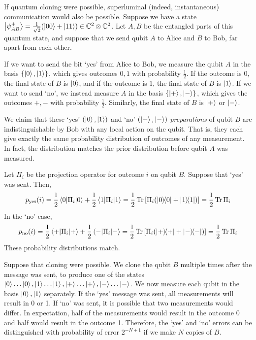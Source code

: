 If quantum cloning were possible, superluminal (indeed, instantaneous) communication would also be possible.
Suppose we have a state \( \ket{\psi^+_{AB}} = \frac{1}{\sqrt{2}} \qty(\ket{00} + \ket{11}) \in \mathbb C^2 \otimes \mathbb C^2 \).
Let \( A, B \) be the entangled parts of this quantum state, and suppose that we send qubit \( A \) to Alice and \( B \) to Bob, far apart from each other.

If we want to send the bit `yes' from Alice to Bob, we measure the qubit \( A \) in the basis \( \qty{\ket{0}, \ket{1}} \), which gives outcomes \( 0, 1 \) with probability \( \frac{1}{2} \).
If the outcome is 0, the final state of \( B \) is \( \ket{0} \), and if the outcome is 1, the final state of \( B \) is \( \ket{1} \).
If we want to send `no', we instead measure \( A \) in the basis \( \qty{\ket{+}, \ket{-}} \), which gives the outcomes \( +, - \) with probability \( \frac{1}{2} \).
Similarly, the final state of \( B \) is \( \ket{+} \) or \( \ket{-} \).

We claim that these `yes' \( (\ket{0}, \ket{1}) \) and `no' \( (\ket{+}, \ket{-}) \) \emph{preparations} of qubit \( B \) are indistinguishable by Bob with any local action on the qubit.
That is, they each give exactly the same probability distribution of outcomes of any measurement.
In fact, the distribution matches the prior distribution before qubit \( A \) was measured.

Let \( \Pi_i \) be the projection operator for outcome \( i \) on qubit \( B \).
Suppose that `yes' was sent.
Then,
\[ p_{\text{yes}}(i) = \frac{1}{2}\ev{\Pi_i}{0} + \frac{1}{2}\ev{\Pi_i}{1} = \frac{1}{2} \Tr \qty[\Pi_i \qty(\op{0}{0} + \op{1}{1})] = \frac{1}{2} \Tr \Pi_i \]
In the `no' case,
\[ p_{\text{no}}(i) = \frac{1}{2}\ev{\Pi_i}{+} + \frac{1}{2}\ev{\Pi_i}{-} = \frac{1}{2} \Tr \qty[\Pi_i \qty(\op{+}{+} + \op{-}{-})] = \frac{1}{2} \Tr \Pi_i \]
These probability distributions match.

Suppose that cloning were possible.
We clone the qubit \( B \) multiple times after the message was sent, to produce one of the states \( \ket{0} \dots \ket{0}, \ket{1} \dots \ket{1}, \ket{+} \dots \ket{+}, \ket{-} \dots \ket{-} \).
We now measure each qubit in the basis \( \ket{0}, \ket{1} \) separately.
If the `yes' message was sent, all measurements will result in 0 or 1.
If `no' was sent, it is possible that two measurements would differ.
In expectation, half of the measurements would result in the outcome 0 and half would result in the outcome 1.
Therefore, the `yes' and `no' errors can be distinguished with probability of error \( 2^{-N+1} \) if we make \( N \) copies of \( B \).

